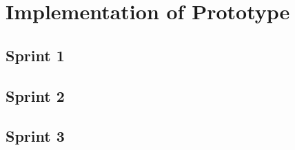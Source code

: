 \section{Implementation of Prototype}
	\subsection{Sprint 1}
	\subsection{Sprint 2}
	\subsection{Sprint 3}